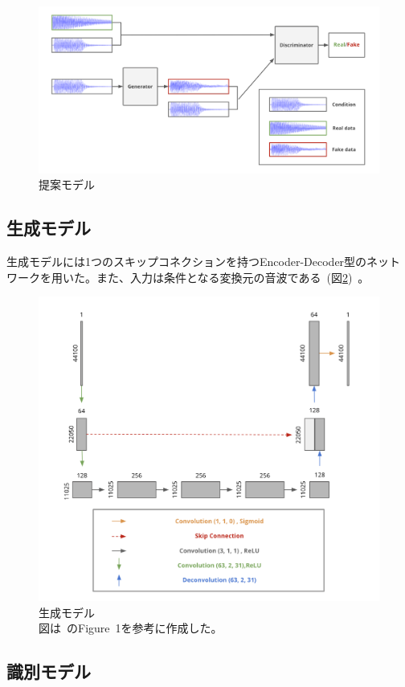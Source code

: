 \clearpage

\begin{figure}[t]
\begin{center}
\includegraphics[width=0.8\hsize]{figure/pr_model.png}
\caption{提案モデル}
\label{fig:pr_model}
\end{center}
\end{figure}

\subsection{生成モデル}

生成モデルには1つのスキップコネクションを持つEncoder-Decoder型のネットワークを用いた。また、入力は条件となる変換元の音波である~(図\ref{fig:pr_gen})~。

\begin{figure}[b]
\begin{center}
\includegraphics[width=0.6\hsize]{figure/pr_generator.png}
\caption{生成モデル\\
図は~\cite{u-net}のFigure~1を参考に作成した。}
\label{fig:pr_gen}
\end{center}
\end{figure}

\clearpage

\subsection{識別モデル}

